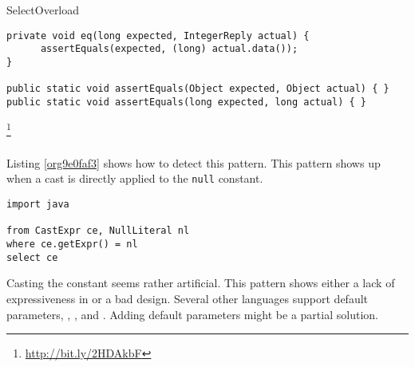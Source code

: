 \begin{pattern}{SelectOverload}
\begin{verbatim}
private void eq(long expected, IntegerReply actual) {
      assertEquals(expected, (long) actual.data());
}

public static void assertEquals(Object expected, Object actual) { }
public static void assertEquals(long expected, long actual) { }
\end{verbatim}


\footnote{\url{http://bit.ly/2HDAkbF}}

\begin{verbatim}
\end{verbatim}

\detection{}
Listing \ref{org9e0faf3} shows how to detect this pattern.
This pattern shows up when a cast is directly applied to the \texttt{null} constant.

\begin{lstlisting}
import java

from CastExpr ce, NullLiteral nl
where ce.getExpr() = nl
select ce
\end{lstlisting}

\discussion{}
Casting the  constant seems rather artificial.
This pattern shows either a lack of expressiveness in \java{} or
a bad \api{} design.
Several other languages support default parameters, \eg{},
\scala{}, \csharp{} and \cpp{}.
Adding default parameters might be a partial solution.
\end{pattern}